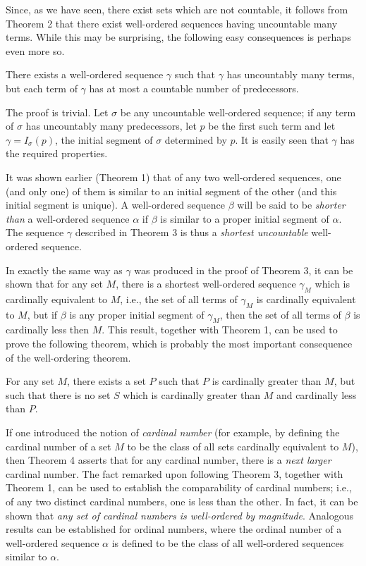\documentclass{article}
\newcounter{theoremcount}
\newenvironment{theorem}
{ \begin{description} \refstepcounter{theoremcount} \item[Theorem \arabic{theoremcount}:] }
{ \end{description} }
\begin{document}
Since, as we have seen, there exist sets which are not countable, it follows from Theorem 2 that there exist well-ordered sequences having uncountable many terms. While this may be surprising, the following easy consequences is perhaps even more so.

\begin{theorem} %
There exists a well-ordered sequence $\gamma$ such that $\gamma$ has uncountably many terms, but each term of $\gamma$ has at most a countable number of predecessors.
\end{theorem}

The proof is trivial. Let $\sigma$ be any uncountable well-ordered sequence; if any term of $\sigma$ has uncountably many predecessors, let $p$ be the first such term and let $\gamma = I_{\sigma}(p)$, the initial segment of $\sigma$ determined by $p$. It is easily seen that $\gamma$ has the required properties.

It was shown earlier (Theorem 1) that of any two well-ordered sequences, one (and only one) of them is similar to an initial segment of the other (and this initial segment is unique). A well-ordered sequence $\beta$ will be said to be \emph{shorter than} a well-ordered sequence $\alpha$ if $\beta$ is similar to a proper initial segment of $\alpha$. The sequence $\gamma$ described in Theorem 3 is thus a \emph{shortest uncountable} well-ordered sequence.

In exactly the same way as $\gamma$ was produced in the proof of Theorem 3, it can be shown that for any set $M$, there is a shortest well-ordered sequence $\gamma_M$ which is cardinally equivalent to $M$, i.e., the set of all terms of $\gamma_M$ is cardinally equivalent to $M$, but if $\beta$ is any proper initial segment of $\gamma_M$, then the set of all terms of $\beta$ is cardinally less then $M$. This result, together with Theorem 1, can be used to prove the following theorem, which is probably the most important consequence of the well-ordering theorem.

\begin{theorem} %
For any set $M$, there exists a set $P$ such that $P$ is cardinally greater than $M$, but such that there is no set $S$ which is cardinally greater than $M$ and cardinally less than $P$.
\end{theorem}

If one introduced the notion of \emph{cardinal number} (for example, by defining the cardinal number of a set $M$ to be the class of all sets cardinally equivalent to $M$), then Theorem 4 asserts that for any cardinal number, there is a \emph{next larger} cardinal number. The fact remarked upon following Theorem 3, together with Theorem 1, can be used to establish the comparability of cardinal numbers; i.e., of any two distinct cardinal numbers, one is less than the other. In fact, it can be shown that \emph{any set of cardinal numbers is well-ordered by magnitude}. Analogous results can be established for ordinal numbers, where the ordinal number of a well-ordered sequence $\alpha$ is defined to be the class of all well-ordered sequences similar to $\alpha$.
\end{document}
